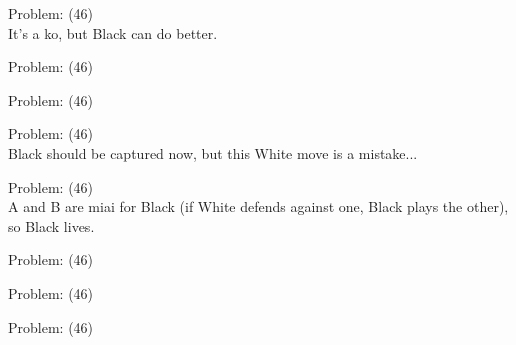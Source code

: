\documentclass[11pt]{article}
\begin{document}
\begin{minipage}[t]{0.5\textwidth}
  {\centering
  
Problem: (46)\\
It's a ko, but Black can do better.\\
  }
\end{minipage}
\begin{minipage}[t]{0.5\textwidth}
  {\centering
  
Problem: (46)\\
  }
\end{minipage}
\begin{minipage}[t]{0.5\textwidth}
  {\centering
  
Problem: (46)\\
  }
\end{minipage}
\begin{minipage}[t]{0.5\textwidth}
  {\centering
  
Problem: (46)\\
Black should be captured now, but this White move is a mistake...\\
  }
\end{minipage}
\begin{minipage}[t]{0.5\textwidth}
  {\centering
  
Problem: (46)\\
A and B are miai for Black (if White defends against one, Black plays the other), so Black lives.\\
  }
\end{minipage}
\begin{minipage}[t]{0.5\textwidth}
  {\centering
  
Problem: (46)\\
  }
\end{minipage}
\begin{minipage}[t]{0.5\textwidth}
  {\centering
  
Problem: (46)\\
  }
\end{minipage}
\begin{minipage}[t]{0.5\textwidth}
  {\centering
  
Problem: (46)\\
  }
\end{minipage}
\end{document}
